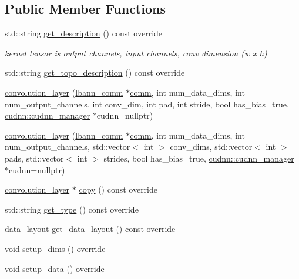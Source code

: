 \subsection*{Public Member Functions}
\begin{DoxyCompactItemize}
\item 
std\+::string \hyperlink{classlbann_1_1convolution__layer_abce67d7e977d148093798936aff8ee5e}{get\+\_\+description} () const override
\begin{DoxyCompactList}\small\item\em kernel tensor is output channels, input channels, conv dimension (w x h) \end{DoxyCompactList}\item 
std\+::string \hyperlink{classlbann_1_1convolution__layer_a5af5bb8b7fb68ed4e5085be676788eed}{get\+\_\+topo\+\_\+description} () const override
\item 
\hyperlink{classlbann_1_1convolution__layer_aad28b1304d9440fc50b3b54438587aa3}{convolution\+\_\+layer} (\hyperlink{classlbann_1_1lbann__comm}{lbann\+\_\+comm} $\ast$\hyperlink{file__io_8cpp_ab048c6f9fcbcfaa57ce68b00263dbebe}{comm}, int num\+\_\+data\+\_\+dims, int num\+\_\+output\+\_\+channels, int conv\+\_\+dim, int pad, int stride, bool has\+\_\+bias=true, \hyperlink{classlbann_1_1cudnn_1_1cudnn__manager}{cudnn\+::cudnn\+\_\+manager} $\ast$cudnn=nullptr)
\item 
\hyperlink{classlbann_1_1convolution__layer_acec65090b712cb902dbf58a6c037cf0c}{convolution\+\_\+layer} (\hyperlink{classlbann_1_1lbann__comm}{lbann\+\_\+comm} $\ast$\hyperlink{file__io_8cpp_ab048c6f9fcbcfaa57ce68b00263dbebe}{comm}, int num\+\_\+data\+\_\+dims, int num\+\_\+output\+\_\+channels, std\+::vector$<$ int $>$ conv\+\_\+dims, std\+::vector$<$ int $>$ pads, std\+::vector$<$ int $>$ strides, bool has\+\_\+bias=true, \hyperlink{classlbann_1_1cudnn_1_1cudnn__manager}{cudnn\+::cudnn\+\_\+manager} $\ast$cudnn=nullptr)
\item 
\hyperlink{classlbann_1_1convolution__layer}{convolution\+\_\+layer} $\ast$ \hyperlink{classlbann_1_1convolution__layer_ac2d126a93bc690a959daed54658aabd5}{copy} () const override
\item 
std\+::string \hyperlink{classlbann_1_1convolution__layer_ac0f341b98118f5494c95f9048bdb7a43}{get\+\_\+type} () const override
\item 
\hyperlink{base_8hpp_a786677cbfb3f5677b4d84f3056eb08db}{data\+\_\+layout} \hyperlink{classlbann_1_1convolution__layer_a496e4bc7465269961603aba305700b84}{get\+\_\+data\+\_\+layout} () const override
\item 
void \hyperlink{classlbann_1_1convolution__layer_adbb45d032ad79c793a159b7ee79eef14}{setup\+\_\+dims} () override
\item 
void \hyperlink{classlbann_1_1convolution__layer_ab20636b44d2b17abdb5424df54cb9c6d}{setup\+\_\+data} () override
\end{DoxyCompactItemize}
